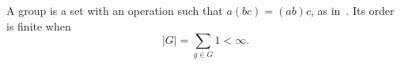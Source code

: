 \documentclass{article}
\begin{document}
A group is a set with an operation such that $a(bc) = (ab)c$,
as in~\cite{groups}. Its order is finite when
\begin{equation}
  |G| = \sum_{g \in G} 1 < \infty.
\end{equation}


\printindex
\end{document}
